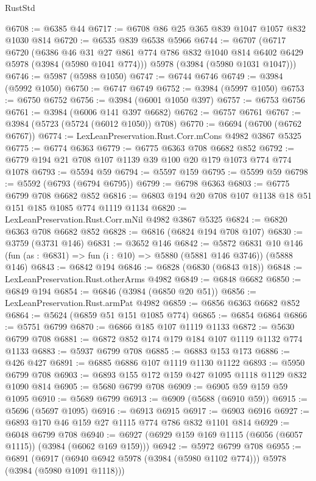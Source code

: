 \begin{lexlean}{RustStd}
\begin{coremodule}
@6708 := @6385 @44
@6717 := @6708 @86 @25 @365 @839 @1047 @1057 @832 @1030 @814
@6720 := @6535 @839 @6538 @5966
@6744 := @6707
    (@6717
      @6720
      (@6386
        @46
        @31
        @27
        @861
        @774
        @786
        @832
        @1040
        @814
        @6402
        @6429
        @5978
        (@3984 (@5980 @1041 @774)))
      @5978
      (@3984 (@5980 @1031 @1047)))
@6746 := @5987 (@5988 @1050)
@6747 := @6744 @6746
@6749 := @3984 (@5992 @1050)
@6750 := @6747 @6749
@6752 := @3984 (@5997 @1050)
@6753 := @6750 @6752
@6756 := @3984 (@6001 @1050 @397)
@6757 := @6753 @6756
@6761 := @3984 (@6006 @141 @397 @6682)
@6762 := @6757 @6761
@6767 := @3984 (@5723 (@5724 (@6012 @1050)) @708)
@6770 := @6694 (@6700 (@6762 @6767))
@6774 := LexLeanPreservation.Rust.Corr.mCons @4982 @3867 @5325
@6775 := @6774 @6363
@6779 := @6775 @6363 @708 @6682 @852
@6792 := @6779 @194 @21 @708 @107 @1139 @39 @100 @20 @179 @1073 @774 @774 @1078
@6793 := @5594 @59
@6794 := @5597 @159
@6795 := @5599 @59
@6798 := @5592 (@6793 (@6794 @6795))
@6799 := @6798 @6363
@6803 := @6775 @6799 @708 @6682 @852
@6816 := @6803 @194 @20 @708 @107 @1138 @18 @51 @151 @185 @1085 @774 @1119 @1134
@6820 := LexLeanPreservation.Rust.Corr.mNil @4982 @3867 @5325
@6824 := @6820 @6363 @708 @6682 @852
@6828 := @6816 (@6824 @194 @708 @107)
@6830 := @3759 (@3731 @146)
@6831 := @3652 @146
@6842 := @5872
    @6831
    @10
    @146
    (fun (as : @6831) => fun (i : @10) => @5880 (@5881 @146 @3746))
    (@5888 @146)
@6843 := @6842 @194
@6846 := @6828 (@6830 (@6843 @18))
@6848 := LexLeanPreservation.Rust.otherArms @4982
@6849 := @6848 @6682
@6850 := @6849 @194
@6854 := @6846 (@3984 (@6850 @20 @51))
@6856 := LexLeanPreservation.Rust.armPat @4982
@6859 := @6856 @6363 @6682 @852
@6864 := @5624 (@6859 @51 @151 @1085 @774)
@6865 := @6854 @6864
@6866 := @5751 @6799
@6870 := @6866 @185 @107 @1119 @1133
@6872 := @5630 @6799 @708
@6881 := @6872 @852 @174 @179 @184 @107 @1119 @1132 @774 @1133
@6883 := @5937 @6799 @708
@6885 := @6883 @153 @173
@6886 := @426 @427
@6891 := @6885 @6886 @107 @1119 @1130 @1122
@6893 := @5950 @6799 @708
@6903 := @6893 @155 @172 @159 @427 @1095 @1118 @1129 @832 @1090 @814
@6905 := @5680 @6799 @708
@6909 := @6905 @59 @159 @59 @1095
@6910 := @5689 @6799
@6913 := @6909 (@5688 (@6910 @59))
@6915 := @5696 (@5697 @1095)
@6916 := @6913 @6915
@6917 := @6903 @6916
@6927 := @6893 @170 @46 @159 @27 @1115 @774 @786 @832 @1101 @814
@6929 := @6048 @6799 @708
@6940 := @6927 (@6929 @159 @169 @1115 (@6056 (@6057 @1115)) (@3984 (@6062 @169 @159)))
@6942 := @5972 @6799 @708
@6955 := @6891
    (@6917 (@6940 @6942 @5978 (@3984 (@5980 @1102 @774))) @5978 (@3984 (@5980 @1091 @1118)))

\end{coremodule}
\end{lexlean}
